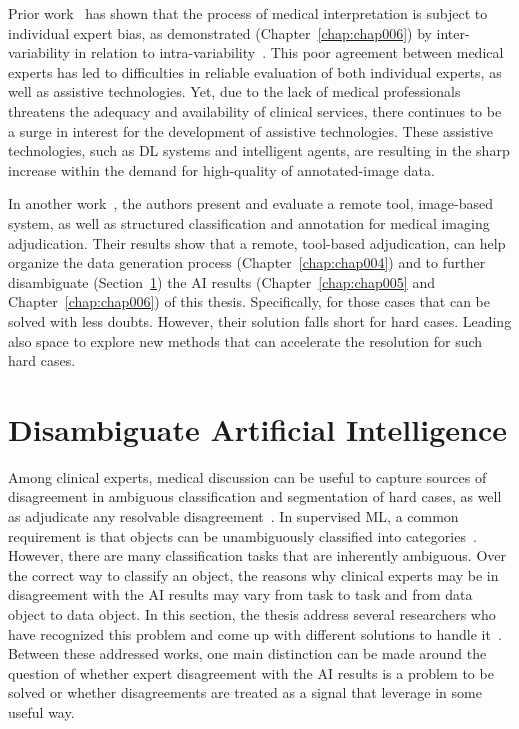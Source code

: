 Prior work~\cite{MIRANDA2015334} has shown that the process of medical interpretation is subject to individual expert bias, as demonstrated (Chapter~\ref{chap:chap006}) by inter-variability in relation to intra-variability~\cite{NIAZI2019e253}.
This poor agreement between medical experts has led to difficulties in reliable evaluation of both individual experts, as well as assistive technologies.
Yet, due to the lack of medical professionals threatens the adequacy and availability of clinical services, there continues to be a surge in interest for the development of assistive technologies.
These assistive technologies, such as \ac{DL} systems and intelligent agents, are resulting in the sharp increase within the demand for high-quality of annotated-image data.

In another work~\cite{10.1167/tvst.8.6.40}, the authors present and evaluate a remote tool, image-based system, as well as structured classification and annotation for medical imaging adjudication.
Their results show that a remote, tool-based adjudication, can help organize the data generation process (Chapter~\ref{chap:chap004}) and to further disambiguate (Section~\ref{sec:sec003006}) the \ac{AI} results (Chapter~\ref{chap:chap005} and Chapter~\ref{chap:chap006}) of this thesis.
Specifically, for those cases that can be solved with less doubts.
However, their solution falls short for hard cases.
Leading also space to explore new methods that can accelerate the resolution for such hard cases.

\section{Disambiguate Artificial Intelligence}
\label{sec:sec003006}

Among clinical experts, medical discussion can be useful to capture sources of disagreement in ambiguous classification and segmentation of hard cases, as well as adjudicate any resolvable disagreement~\cite{10.1145/3308560.3317085}.
In supervised \ac{ML}, a common requirement is that objects can be unambiguously classified into categories~\cite{castro2020causality}.
However, there are many classification tasks that are inherently ambiguous.
Over the correct way to classify an object, the reasons why clinical experts may be in disagreement with the \ac{AI} results may vary from task to task and from data object to data object.
In this section, the thesis address several researchers who have recognized this problem and come up with different solutions to handle it~\cite{10.1145/3313831.3376506, 10.1145/3313831.3376590, Tschandl2020}.
Between these addressed works, one main distinction can be made around the question of whether expert disagreement with the \ac{AI} results is a problem to be solved or whether disagreements are treated as a signal that leverage in some useful way.

